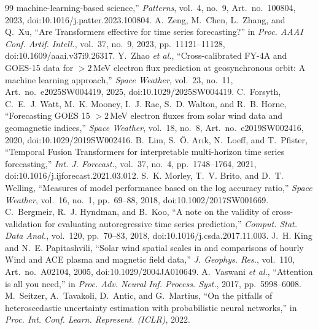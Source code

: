\documentclass[conference,a4paper]{IEEEtran}
\begin{document}
\begin{thebibliography}{99}
machine-learning-based science,'' \emph{Patterns}, vol.~4, no.~9,
Art.~no.~100804, 2023, doi:10.1016/j.patter.2023.100804.
A.~Zeng, M.~Chen, L.~Zhang, and Q.~Xu, ``Are Transformers effective for time
series forecasting?'' in \emph{Proc. AAAI Conf. Artif. Intell.}, vol.~37,
no.~9, 2023, pp.~11121--11128, doi:10.1609/aaai.v37i9.26317.
Y.~Zhao \emph{et al.}, ``Cross-calibrated FY-4A and GOES-15 data for
\({>}2\)\,MeV electron flux prediction at geosynchronous orbit: A machine
learning approach,'' \emph{Space Weather}, vol.~23, no.~11,
Art.~no.~e2025SW004419, 2025, doi:10.1029/2025SW004419.
C.~Forsyth, C.~E.~J. Watt, M.~K. Mooney, I.~J. Rae, S.~D. Walton, and
R.~B. Horne, ``Forecasting GOES 15 \({>}2\)\,MeV electron fluxes from solar
wind data and geomagnetic indices,'' \emph{Space Weather}, vol.~18, no.~8,
Art.~no.~e2019SW002416, 2020, doi:10.1029/2019SW002416.
B.~Lim, S.~\"O. Ar{\i}k, N.~Loeff, and T.~Pfister, ``Temporal Fusion
Transformers for interpretable multi-horizon time series forecasting,''
\emph{Int. J. Forecast.}, vol.~37, no.~4, pp.~1748--1764, 2021,
doi:10.1016/j.ijforecast.2021.03.012.
S.~K. Morley, T.~V. Brito, and D.~T. Welling, ``Measures of model performance
based on the log accuracy ratio,'' \emph{Space Weather}, vol.~16, no.~1,
pp.~69--88, 2018, doi:10.1002/2017SW001669.
C.~Bergmeir, R.~J. Hyndman, and B.~Koo, ``A note on the validity of
cross-validation for evaluating autoregressive time series prediction,''
\emph{Comput. Stat. Data Anal.}, vol.~120, pp.~70--83, 2018,
doi:10.1016/j.csda.2017.11.003.
J.~H. King and N.~E. Papitashvili, ``Solar wind spatial scales in and
comparisons of hourly Wind and ACE plasma and magnetic field data,''
\emph{J. Geophys. Res.}, vol.~110, Art.~no.~A02104, 2005,
doi:10.1029/2004JA010649.
A.~Vaswani \emph{et al.}, ``Attention is all you need,'' in \emph{Proc. Adv.
Neural Inf. Process. Syst.}, 2017, pp.~5998--6008.
M.~Seitzer, A.~Tavakoli, D.~Antic, and G.~Martius, ``On the pitfalls of
heteroscedastic uncertainty estimation with probabilistic neural networks,''
in \emph{Proc. Int. Conf. Learn. Represent. (ICLR)}, 2022.
\end{thebibliography}
\end{document}
